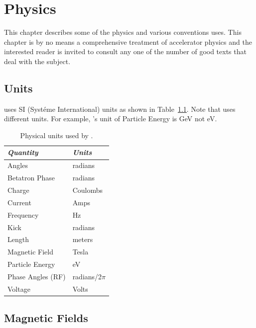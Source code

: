 \chapter{Physics}

This chapter describes some of the physics and various conventions
\bmad uses. This chapter is by no means a comprehensive treatment
of accelerator physics and the interested reader is invited to consult 
any one of the number of good texts that deal with the subject\cite{b:wiedemann}.

\section{Units}
\label{s:units}

\bmad uses SI (Syst\'eme International) units as shown in
Table~\ref{t:units}.  Note that \mad uses different units. For example,
\mad's unit of Particle Energy is GeV not eV.
\begin{table}[ht]
\centering
\begin{tabular}{|l|l|} \hline
  {\em Quantity}     & {\em Units}       \\ \hline
  Angles             &    radians        \\ 
  Betatron Phase     &    radians        \\
  Charge             &    Coulombs       \\
  Current            &    Amps           \\ 
  Frequency          &    Hz             \\ 
  Kick               &    radians        \\ 
  Length             &    meters         \\ 
  Magnetic Field     &    Tesla          \\ 
  Particle Energy    &    eV             \\ 
  Phase Angles (RF)  &    radians/2$\pi$ \\ 
  Voltage            &    Volts          \\ \hline
\end{tabular}
\caption{Physical units used by \bmad.}
\label{t:units}
\end{table}

\section{Magnetic Fields}
\label{s:fields}

